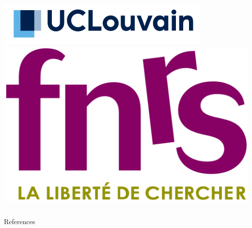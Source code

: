 \documentclass{beamer}
\begin{document}
\begin{frame}[b]
  \vfill
  \begin{columns}
    \includegraphics[width=\linewidth]{figs/ucl.png}
    \includegraphics[width=\linewidth]{figs/fnrs.png}
  \end{columns}
\end{frame}




\begin{frame}[allowframebreaks]{References}
  \scriptsize
  
  
\end{frame}
\end{document}
